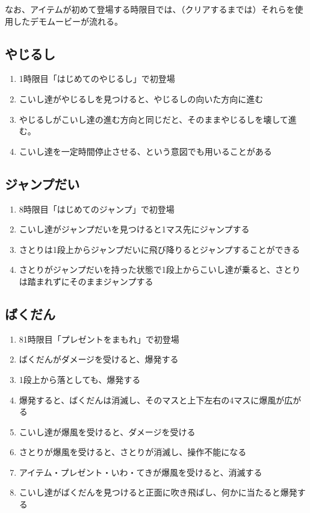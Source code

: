 なお、アイテムが初めて登場する時限目では、（クリアするまでは）それらを使用したデモムービーが流れる。


\subsection{やじるし}
\begin{enumerate}[label={\sarrow}]
\item 1時限目「はじめてのやじるし」で初登場
\item こいし達がやじるしを見つけると、やじるしの向いた方向に進む
\item やじるしがこいし達の進む方向と同じだと、そのままやじるしを壊して進む。
\item こいし達を一定時間停止させる、という意図でも用いることがある
\end{enumerate}


\subsection{ジャンプだい}
\begin{enumerate}[label={\sarrow}]
\item 8時限目「はじめてのジャンプ」で初登場
\item こいし達がジャンプだいを見つけると1マス先にジャンプする
\item さとりは1段上からジャンプだいに飛び降りるとジャンプすることができる
\item さとりがジャンプだいを持った状態で1段上からこいし達が乗ると、さとりは踏まれずにそのままジャンプする
\end{enumerate}


\subsection{ばくだん}
\begin{enumerate}[label={\sarrow}]
\item 81時限目「プレゼントをまもれ」で初登場
\item ばくだんがダメージを受けると、爆発する
\item 1段上から落としても、爆発する
\item 爆発すると、ばくだんは消滅し、そのマスと上下左右の4マスに爆風が広がる
\item こいし達が爆風を受けると、ダメージを受ける
\item さとりが爆風を受けると、さとりが消滅し、操作不能になる
\item アイテム・プレゼント・いわ・てきが爆風を受けると、消滅する
\item こいし達がばくだんを見つけると正面に吹き飛ばし、何かに当たると爆発する
\end{enumerate}


